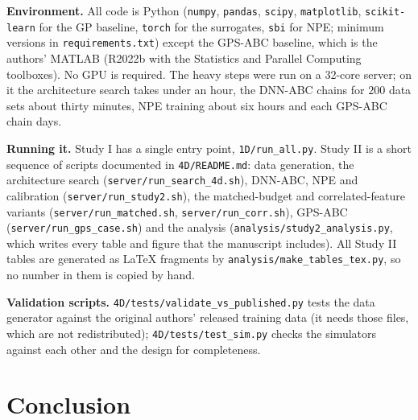 \documentclass[sn-basic,iicol,pdflatex]{sn-jnl}
\begin{document}
\noindent\textbf{Environment.} All code is Python (\texttt{numpy}, \texttt{pandas}, \texttt{scipy}, \texttt{matplotlib},
\texttt{scikit-learn} for the GP baseline, \texttt{torch} for the surrogates, \texttt{sbi} for NPE; minimum versions in
\texttt{requirements.txt}) except the GPS-ABC baseline, which is the authors' MATLAB (R2022b with the Statistics and Parallel
Computing toolboxes). No GPU is required. The heavy steps were run on a 32-core server; on it the architecture search takes
under an hour, the DNN-ABC chains for $200$ data sets about thirty minutes, NPE training about six hours and each GPS-ABC chain days.

\noindent\textbf{Running it.} Study I has a single entry point, \texttt{1D/run\_all.py}. Study II is a short sequence of
scripts documented in \texttt{4D/README.md}: data generation, the architecture search (\texttt{server/run\_search\_4d.sh}), DNN-ABC,
NPE and calibration (\texttt{server/run\_study2.sh}), the matched-budget and correlated-feature variants
(\texttt{server/run\_matched.sh}, \texttt{server/run\_corr.sh}), GPS-ABC (\texttt{server/run\_gps\_case.sh}) and the analysis
(\texttt{analysis/study2\_analysis.py}, which writes every table and figure that the manuscript includes).
All Study II tables are generated as \LaTeX{} fragments by \texttt{analysis/make\_tables\_tex.py}, so no number in them is copied by hand.

\noindent\textbf{Validation scripts.} \texttt{4D/tests/validate\_vs\_published.py} tests the data generator against the original
authors' released training data (it needs those files, which are not redistributed);
\texttt{4D/tests/test\_sim.py} checks the simulators against each other and the design for completeness.

\section{Conclusion}
\label{sec:conclusion}
\end{document}
